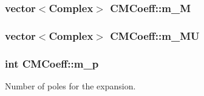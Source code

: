 \hypertarget{classCMCoeff_a15347641cc66b95ff56bea89f4585edf}{
\subsubsection[{m\-\_\-\-M}]{\setlength{\rightskip}{0pt plus 5cm}vector$<${\bf Complex}$>$ C\-M\-Coeff\-::m\-\_\-\-M\hspace{0.3cm}{\ttfamily [protected]}}}\label{classCMCoeff_a15347641cc66b95ff56bea89f4585edf}
\hypertarget{classCMCoeff_a2fc4617b2a37d2ca033aea2f5e02b5de}{
\subsubsection[{m\-\_\-\-M\-U}]{\setlength{\rightskip}{0pt plus 5cm}vector$<${\bf Complex}$>$ C\-M\-Coeff\-::m\-\_\-\-M\-U\hspace{0.3cm}{\ttfamily [protected]}}}\label{classCMCoeff_a2fc4617b2a37d2ca033aea2f5e02b5de}
\hypertarget{classCMCoeff_adf49f0bd55b7c496b887f547695aba38}{
\subsubsection[{m\-\_\-p}]{\setlength{\rightskip}{0pt plus 5cm}int C\-M\-Coeff\-::m\-\_\-p\hspace{0.3cm}{\ttfamily [protected]}}}\label{classCMCoeff_adf49f0bd55b7c496b887f547695aba38}


Number of poles for the expansion. 

